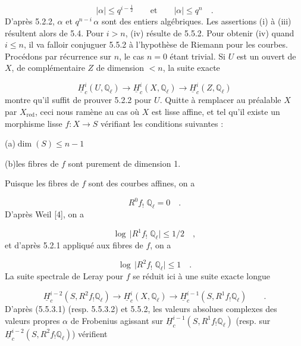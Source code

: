 \begin{equation*}
|\alpha| \leq q^{i-\frac{1}{2}} \qquad \mathrm{et} \qquad |\alpha| \leq q^n \quad .
\end{equation*}
D'après 5.2.2, $\alpha$ et $q^{n-i} \, \alpha$ sont des entiers algébriques. Les assertions (i) à (iii) résultent alors de 5.4. Pour $i > n$, (iv) résulte de 5.5.2. Pour obtenir (iv) quand $i \leq n$, il va falloir conjuguer 5.5.2 à l'hypothèse de Riemann pour les courbes. Procédons par récurrence sur $n$, le cas $n = 0$ étant trivial. Si $U$ est un ouvert de $X$, de complémentaire $Z$ de dimension $< n$, la suite exacte

\begin{equation*}
\underline{H}^i_c(U,\mathbb{Q}_\ell) \longrightarrow \underline{H}^i_c(X,\mathbb{Q}_\ell) \longrightarrow \underline{H}^i_c(Z,\mathbb{Q}_\ell)
\end{equation*}
montre qu'il suffit de prouver 5.2.2 pour $U$. Quitte à remplacer au préalable $X$ par $X_{\mathrm{red}}$, ceci nous ramène au cas où $X$ est lisse affine,
et tel qu'il existe un morphisme lisse $f : X \longrightarrow S$ vérifiant les conditions suivantes :

(a)\quad $\dim(S) \leq n-1$

(b)\quad les fibres de $f$ sont purement de dimension 1.

Puisque les fibres de $f$ sont des courbes affines, on a

\begin{equation*}
R^0 f_! \; \mathbb{Q}_\ell = 0 \quad .
\end{equation*}
D'après Weil [4], on a

\begin{equation}\tag{5.5.3.1}
\log \, \bigl| R^1 f_! \; \mathbb{Q}_\ell \bigr| \leq 1/2 \quad ,
\end{equation}
et d'après 5.2.1 appliqué aux fibres de $f$, on a

\begin{equation}\tag{5.5.3.2}
\log \, \bigl| R^2 f_! \; \mathbb{Q}_\ell \bigr| \leq 1 \quad .
\end{equation}
La suite spectrale de Leray pour $f$ se réduit ici à une suite exacte longue

\begin{equation*}
\underline{H}^{i-2}_c(S,R^2 f_! \mathbb{Q}_\ell) \longrightarrow \underline{H}^i_c(X,\mathbb{Q}_\ell) \longrightarrow \underline{H}^{i-1}_c(S,R^1 f_! \mathbb{Q}_\ell) \qquad .
\end{equation*}
D'après (5.5.3.1) (resp. 5.5.3.2) et 5.5.2, les valeurs absolues complexes des valeurs propres $\alpha$ de Frobenius agissant sur $\underline{H}^{i-1}_c(S,R^1 f_! \mathbb{Q}_\ell)$ (resp. sur $\underline{H}^{i-2}_c(S,R^2 f_! \mathbb{Q}_\ell)$) vérifient

